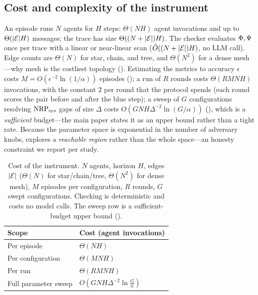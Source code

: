 \subsection{Cost and complexity of the instrument}
\label{app:complexity}
An episode runs $N$ agents for $H$ steps: $\Theta(NH)$ agent invocations and up to
$\Theta(|\mathcal{E}|H)$ messages; the trace has size $\Theta((N+|\mathcal{E}|)H)$. The checker
evaluates $\Phi,\Psi$ once per trace with a linear or near-linear scan
($\tilde{O}((N+|\mathcal{E}|)H)$, no LLM call). Edge counts are $\Theta(N)$ for star, chain,
and tree, and $\Theta(N^2)$ for a dense mesh---why mesh is the costliest topology
(). Estimating the metrics to accuracy $\epsilon$ costs
$M=O(\epsilon^{-2}\ln(1/\alpha))$ episodes (); a \corb{} run of $R$
rounds costs $\Theta(RMNH)$ invocations, with the constant $2$ per round that the protocol
spends (each round scores the pair before and after the blue step); a sweep of $G$
configurations resolving $\mathrm{NRP}_{\mathrm{sys}}$ gaps of size $\Delta$ costs
$O(GNH\Delta^{-2}\ln(G/\alpha))$ (), which is a \emph{sufficient}
budget---the main paper states it as an upper bound rather than a tight rate. Because the
parameter space is exponential in the number of adversary knobs, \corb{} explores a
\emph{reachable region} rather than the whole space---an honesty constraint we report per
study.

\begin{table}[t]
\centering
\caption{Cost of the  instrument. $N$ agents, horizon $H$, edges $|\mathcal{E}|$
($\Theta(N)$ for star/chain/tree, $\Theta(N^2)$ for dense mesh), $M$ episodes per
configuration, $R$ \corb{} rounds, $G$ swept configurations. Checking is deterministic and
costs no model calls. The sweep row is a sufficient-budget upper bound ().}
\label{tab:complexity}
\small
\renewcommand{\arraystretch}{1.08}
\setlength{\tabcolsep}{4pt}
\begin{tabular}{@{}ll@{}}
\toprule
Scope & Cost (agent invocations) \\
\midrule
Per episode        & $\Theta(NH)$ \\
Per configuration  & $\Theta(MNH)$ \\
Per \corb{} run    & $\Theta(RMNH)$ \\
Full parameter sweep & $O(GNH\Delta^{-2}\ln\tfrac{G}{\alpha})$ \\
\bottomrule
\end{tabular}
\end{table}

